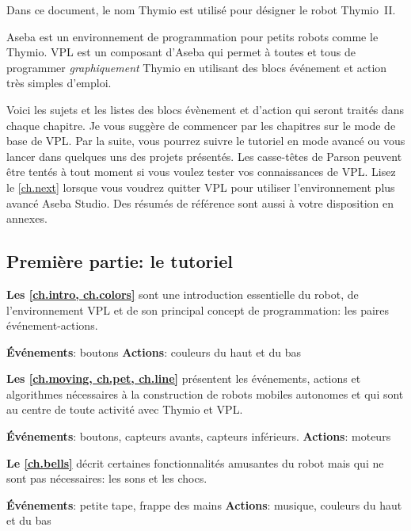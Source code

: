 Dans ce document, le nom Thymio est utilisé pour désigner le robot Thymio~II.

Aseba est un environnement de programmation pour petits robots comme le Thymio.
VPL est un composant d'Aseba qui permet à toutes et tous de programmer \textit{graphiquement} Thymio en utilisant des blocs événement et action très simples d'emploi.

Voici les sujets et les listes des blocs évènement et d'action qui seront traités dans chaque chapitre.
Je vous suggère de commencer par les chapitres sur le mode de base de VPL.
Par la suite, vous pourrez suivre le tutoriel en mode avancé ou vous lancer dans quelques uns des projets présentés.
Les casse-têtes de Parson peuvent être tentés à tout moment si vous voulez tester vos connaissances de VPL.
Lisez le \cref{ch.next} lorsque vous voudrez quitter VPL pour utiliser l'environnement plus avancé Aseba Studio.
Des résumés de référence sont aussi à votre disposition en annexes.

\subsection*{Première partie: le tutoriel}
\textbf{Les \cref{ch.intro, ch.colors}} sont une introduction essentielle du robot, de l'environnement VPL et de son principal concept de programmation: les paires événement-actions.

\textbf{Événements}: boutons\hfill
\textbf{Actions}: couleurs du haut et du bas

\hfill{}\quad{}

\medskip

\textbf{Les \cref{ch.moving, ch.pet, ch.line}} présentent les événements, actions et algorithmes nécessaires à la construction de robots mobiles autonomes et qui sont au centre de toute activité avec Thymio et VPL.

\textbf{Événements}: boutons, capteurs avants, capteurs inférieurs.\hfill
\textbf{Actions}: moteurs

 \quad{} \quad {}\hfill
{}

\medskip

\textbf{Le \cref{ch.bells}} décrit certaines fonctionnalités amusantes du robot mais qui ne sont pas nécessaires: les sons et les chocs.

\textbf{Événements}: petite tape, frappe des mains\hfill
\textbf{Actions}: musique, couleurs du haut et du bas

